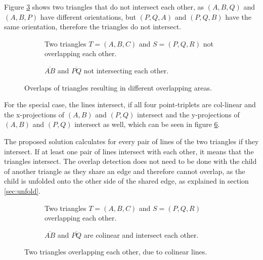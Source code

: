 \documentclass[draft,final]{vutinfth} %
\begin{document}
Figure \ref{fig:nooverlap} shows two triangles that do not intersect each other, as $(A,B,Q)$ and $(A,B,P)$ have different orientations, but $(P,Q,A)$ and $(P,Q,B)$ have the same orientation, therefore the triangles do not intersect.

\begin{figure}
\centering
\begin{subfigure}[t]{.4\textwidth}
	
  \caption{Two triangles $T = (A,B,C)$ and $S = (P,Q,R)$ not overlapping each other.}
	\label{fig:fignotrioverlap}
\end{subfigure}%
\hspace{.1\textwidth}
\begin{subfigure}[t]{.4\textwidth}
	
	\caption{$\overline{AB}$ and $\overline{PQ}$ not intersecting each other.}
	\label{fig:fignolineintersection}
\end{subfigure}
\caption{Overlaps of triangles resulting in different overlapping areas.}
\label{fig:nooverlap}
\end{figure}

For the special case, the lines intersect, if all four point-triplets are col-linear and the x-projections of $(A,B)$ and $(P,Q)$ intersect and the y-projections of $(A,B)$ and $(P,Q)$ intersect as well, which can be seen in figure \ref{fig:colinearoverlap}.

The proposed solution calculates for every pair of lines of the two triangles if they intersect. If at least one pair of lines intersect with each other, it means that the triangles intersect. The overlap detection does not need to be done with the child of another triangle as they share an edge and therefore cannot overlap, as the child is unfolded onto the other side of the shared edge, as explained in section \ref{sec:unfold}.

\begin{figure}
\centering
\begin{subfigure}[t]{.4\textwidth}
	
  \caption{Two triangles $T = (A,B,C)$ and $S = (P,Q,R)$ overlapping each other.}
	\label{fig:figcolineartri}
\end{subfigure}%
\hspace{.1\textwidth}
\begin{subfigure}[t]{.4\textwidth}
	
	\caption{$\overline{AB}$ and $\overline{PQ}$ are colinear and intersect each other.}
	\label{fig:figcolinearline}
\end{subfigure}
\caption{Two triangles overlapping each other, due to colinear lines.}
\label{fig:colinearoverlap}
\end{figure}
\end{document}
